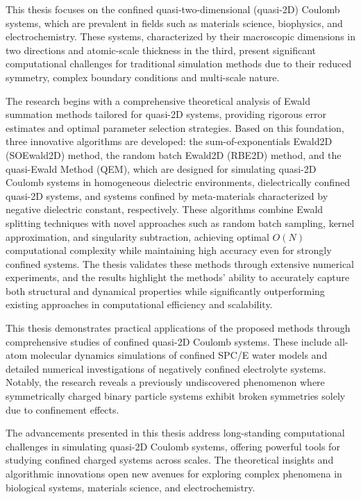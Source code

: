This thesis focuses on the confined quasi-two-dimensional (quasi-2D) Coulomb systems, which are prevalent in fields such as materials science, biophysics, and electrochemistry. 
These systems, characterized by their macroscopic dimensions in two directions and atomic-scale thickness in the third, present significant computational challenges for traditional simulation methods due to their reduced symmetry, complex boundary conditions and multi-scale nature.

The research begins with a comprehensive theoretical analysis of Ewald summation methods tailored for quasi-2D systems, providing rigorous error estimates and optimal parameter selection strategies. 
Based on this foundation, three innovative algorithms are developed: the sum-of-exponentials Ewald2D (SOEwald2D) method, the random batch Ewald2D (RBE2D) method, and the quasi-Ewald Method (QEM), which are designed for simulating quasi-2D Coulomb systems in homogeneous dielectric environments, dielectrically confined quasi-2D systems, and systems confined by meta-materials characterized by negative dielectric constant, respectively.
These algorithms combine Ewald splitting techniques with novel approaches such as random batch sampling, kernel approximation, and singularity subtraction, achieving optimal $O(N)$ computational complexity while maintaining high accuracy even for strongly confined systems.
The thesis validates these methods through extensive numerical experiments, and the results highlight the methods' ability to accurately capture both structural and dynamical properties while significantly outperforming existing approaches in computational efficiency and scalability.

This thesis demonstrates practical applications of the proposed methods through comprehensive studies of confined quasi-2D Coulomb systems. 
These include all-atom molecular dynamics simulations of confined SPC/E water models and detailed numerical investigations of negatively confined electrolyte systems. 
Notably, the research reveals a previously undiscovered phenomenon where symmetrically charged binary particle systems exhibit broken symmetries solely due to confinement effects.

The advancements presented in this thesis address long-standing computational challenges in simulating quasi-2D Coulomb systems, offering powerful tools for studying confined charged systems across scales. 
The theoretical insights and algorithmic innovations open new avenues for exploring complex phenomena in biological systems, materials science, and electrochemistry.